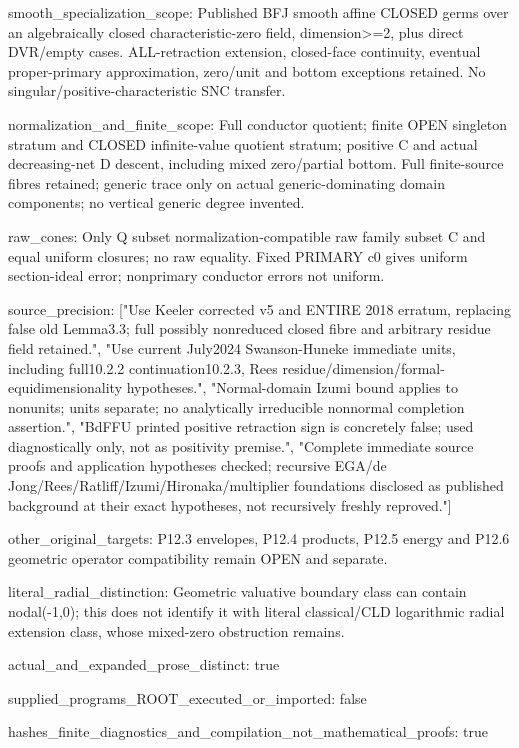 \documentclass[11pt]{article}
\begin{document}
smooth\_specialization\_scope: Published BFJ smooth affine CLOSED germs over an algebraically closed characteristic-zero field, dimension>=2, plus direct DVR/empty cases. ALL-retraction extension, closed-face continuity, eventual proper-primary approximation, zero/unit and bottom exceptions retained. No singular/positive-characteristic SNC transfer.

normalization\_and\_finite\_scope: Full conductor quotient; finite OPEN singleton stratum and CLOSED infinite-value quotient stratum; positive C and actual decreasing-net D descent, including mixed zero/partial bottom. Full finite-source fibres retained; generic trace only on actual generic-dominating domain components; no vertical generic degree invented.

raw\_cones: Only Q subset normalization-compatible raw family subset C and equal uniform closures; no raw equality. Fixed PRIMARY c0 gives uniform section-ideal error; nonprimary conductor errors not uniform.

source\_precision: ["Use Keeler corrected v5 and ENTIRE 2018 erratum, replacing false old Lemma3.3; full possibly nonreduced closed fibre and arbitrary residue field retained.", "Use current July2024 Swanson-Huneke immediate units, including full10.2.2 continuation10.2.3, Rees residue/dimension/formal-equidimensionality hypotheses.", "Normal-domain Izumi bound applies to nonunits; units separate; no analytically irreducible nonnormal completion assertion.", "BdFFU printed positive retraction sign is concretely false; used diagnostically only, not as positivity premise.", "Complete immediate source proofs and application hypotheses checked; recursive EGA/de Jong/Rees/Ratliff/Izumi/Hironaka/multiplier foundations disclosed as published background at their exact hypotheses, not recursively freshly reproved."]

other\_original\_targets: P12.3 envelopes, P12.4 products, P12.5 energy and P12.6 geometric operator compatibility remain OPEN and separate.

literal\_radial\_distinction: Geometric valuative boundary class can contain nodal(-1,0); this does not identify it with literal classical/CLD logarithmic radial extension class, whose mixed-zero obstruction remains.

actual\_and\_expanded\_prose\_distinct: true

supplied\_programs\_ROOT\_executed\_or\_imported: false

hashes\_finite\_diagnostics\_and\_compilation\_not\_mathematical\_proofs: true
\end{document}

